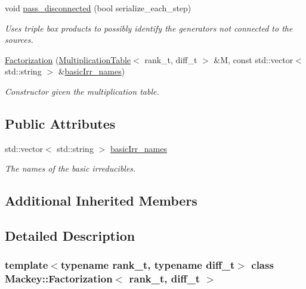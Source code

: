 \begin{DoxyCompactItemize}
void \hyperlink{classMackey_1_1Factorization_aad2d840b523d193f4c3554e9e3f7fb00}{pass\+\_\+disconnected} (bool serialize\+\_\+each\+\_\+step)
\begin{DoxyCompactList}\small\item\em Uses triple box products to possibly identify the generators not connected to the sources. \end{DoxyCompactList}\item 
\hyperlink{classMackey_1_1Factorization_a4d55bc1d6f94bdbcd365ed1bb0eaa2cb}{Factorization} (\hyperlink{classMackey_1_1MultiplicationTable}{Multiplication\+Table}$<$ rank\+\_\+t, diff\+\_\+t $>$ \&M, const std\+::vector$<$ std\+::string $>$ \&\hyperlink{classMackey_1_1Factorization_aafee5aadae0d83b75741e0e8c2955625}{basic\+Irr\+\_\+names})
\begin{DoxyCompactList}\small\item\em Constructor given the multiplication table. \end{DoxyCompactList}\end{DoxyCompactItemize}
\subsection*{Public Attributes}
\begin{DoxyCompactItemize}
\item 
std\+::vector$<$ std\+::string $>$ \hyperlink{classMackey_1_1Factorization_aafee5aadae0d83b75741e0e8c2955625}{basic\+Irr\+\_\+names}
\begin{DoxyCompactList}\small\item\em The names of the basic irreducibles. \end{DoxyCompactList}\end{DoxyCompactItemize}
\subsection*{Additional Inherited Members}


\subsection{Detailed Description}
\subsubsection*{template$<$typename rank\+\_\+t, typename diff\+\_\+t$>$\newline
class Mackey\+::\+Factorization$<$ rank\+\_\+t, diff\+\_\+t $>$}

